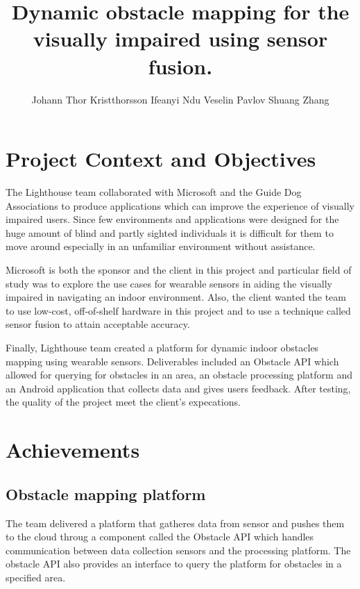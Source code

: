 \documentclass[prodmode,acmtosem]{acmsmall} %
\begin{document}

\title{Dynamic obstacle mapping for the visually impaired using sensor fusion.}
\author{Johann Thor Kristthorsson
Ifeanyi Ndu
Veselin Pavlov
Shuang Zhang
}
\maketitle

\section{Project Context and Objectives}
The Lighthouse team collaborated with Microsoft and the Guide Dog Associations to produce applications which can improve the experience of visually impaired users. Since few environments and applications were designed for the huge amount of blind and partly sighted individuals it is difficult for them to move around especially in an unfamiliar environment without assistance. 

Microsoft is both the sponsor and the client in this project and particular field of study was to explore the use cases for wearable sensors in aiding the visually impaired in navigating an indoor environment. Also, the client wanted the team to use low-cost, off-of-shelf hardware in this project and to use a technique called sensor fusion to attain acceptable accuracy.

Finally, Lighthouse team created a platform for dynamic indoor obstacles mapping using wearable sensors. Deliverables included an Obstacle API which allowed for querying for obstacles in an area, an obstacle processing platform and an Android application that collects data and gives users feedback. After testing, the quality of the project meet the client's expecations.

\section{Achievements}
\subsection{Obstacle mapping platform}
The team delivered a platform that gatheres data from sensor and pushes them to the cloud throug a component called the Obstacle API which handles communication between data collection sensors and the processing platform. The obstacle API also provides an interface to query the platform for obstacles in a specified area. 
\end{document}

